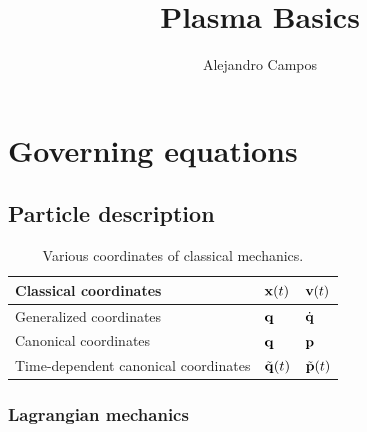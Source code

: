 \documentclass[a4paper,11pt]{report}
\title{Plasma Basics}
\author{Alejandro Campos}
\newcommand{\qvecdot}{\dot{\qvec}}
\begin{document}
\maketitle
\tableofcontents

\chapter{Governing equations}

\section{Particle description}
\begin{table}[H]
    \renewcommand{\arraystretch}{1.5}
    \centering
    \caption{Various coordinates of classical mechanics. }
    \label{tb:classical_mechanics_coordinates}
     \begin{tabular}{|l|l|l|}
        \hline
        Classical coordinates & $\mathbf{x}(t)$ & $\mathbf{v}(t)$ \\
        \hline
        Generalized coordinates  & $\mathbf{q}$ & $\qvecdot$ \\
        \hline
        Canonical coordinates & $\mathbf{q}$ & $\mathbf{p}$ \\
        \hline
        Time-dependent canonical coordinates & $\tilde{\mathbf{q}}(t)$ & $ \tilde{\mathbf{p}}(t)$ \\
        \hline
     \end{tabular}
\end{table}
    
\subsection{Lagrangian mechanics}
    
\end{document}

